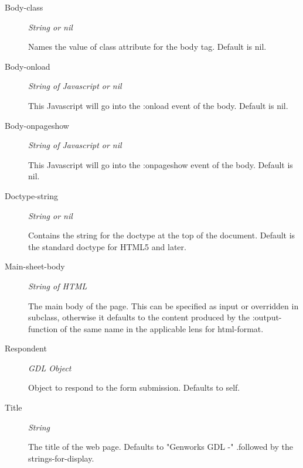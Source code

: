 \documentclass [11pt]{book}
\begin{document}
\begin{itemize}
\begin{description}

\item [Body-class]
\emph{String or nil}

 Names the value of class attribute for the body tag. Default is nil.




\item [Body-onload]
\emph{String of Javascript or nil}

 This Javascript will go into the :onload event of the body.
Default is nil.




\item [Body-onpageshow]
\emph{String of Javascript or nil}

 This Javascript will go into the :onpageshow event of the body.
Default is nil.




\item [Doctype-string]
\emph{String or nil}

 Contains the string for the doctype at the top of the document.
Default is the standard doctype for HTML5 and later.




\item [Main-sheet-body]
\emph{String of HTML}

 The main body of the page.
This can be specified as input or overridden in subclass, otherwise it defaults
to the content produced by the :output-function of the same name
in the applicable lens for  html-format.




\item [Respondent]
\emph{GDL Object}

 Object to respond to the form submission. Defaults to self.




\item [Title]
\emph{String}

 The title of the web page. Defaults to "Genworks GDL -"
.followed by the strings-for-display.




\end{description}







\end{itemize}
\end{document}

